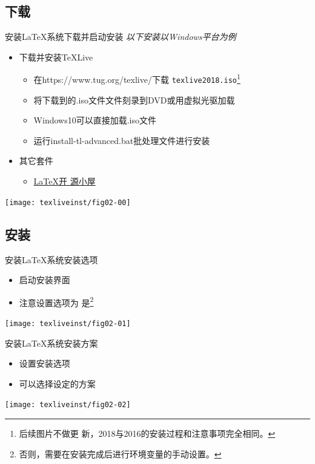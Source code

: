 \documentclass[xcolor=svgnames, t, aspectratio=169]{ctexbeamer}
\begin{document}
\subsection[下载]{下载}
\begin{frame}[t]{安装\LaTeX 系统}{下载并启动安装}
  \stretchon
  \emph{以下安装以Windows平台为例}
  \begin{itemize}
  \item 下载并安装\TeX Live
    \begin{itemize}
    \item 在\url{}{https://www.tug.org/texlive/}下载
      \texttt{texlive2018.iso}\footnote[frame]{后续图片不做更
        新，2018与2016的安装过程和注意事项完全相同。}
    \item 将下载到的.iso文件文件刻录到DVD或用虚拟光驱加载
    \item Windows10可以\alert{直接加载}.iso文件
    \item 运行install-tl-advanced.bat批处理文件进行安装
    \end{itemize}
  \item 其它套件
    \begin{itemize}
    \item \href{http://www.latexstudio.net/page/texsoftware}{\LaTeX 开
        源小屋}
    \end{itemize}
  \end{itemize}
  \centering\vspace{-4ex}
  \texttt{[image: texliveinst/fig02-00]}
  \stretchoff
\end{frame}
\subsection[安装]{安装}
\begin{frame}[t]{安装\LaTeX 系统}{安装选项}
  \begin{itemize}
  \item 启动安装界面
  \item 注意设置选项为
    \alert{是}\footnote[frame]{否则，需要在安装完成后进行环境变量的手动设置。}
  \end{itemize}
  \centering
  \texttt{[image: texliveinst/fig02-01]}
\end{frame}

\begin{frame}[t]{安装\LaTeX 系统}{安装方案}
  \begin{itemize}
  \item 设置安装选项
  \item 可以选择设定的方案
  \end{itemize}
  \centering
  \texttt{[image: texliveinst/fig02-02]}
\end{frame}
\end{document}
